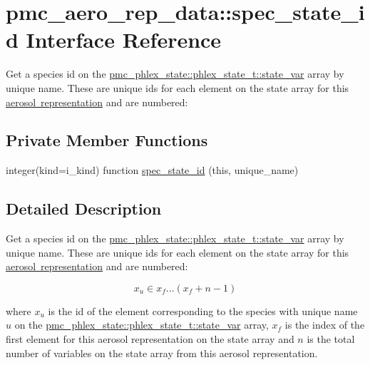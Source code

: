 \hypertarget{interfacepmc__aero__rep__data_1_1spec__state__id}{}\section{pmc\+\_\+aero\+\_\+rep\+\_\+data\+:\+:spec\+\_\+state\+\_\+id Interface Reference}
\label{interfacepmc__aero__rep__data_1_1spec__state__id}


Get a species id on the {\ttfamily \mbox{\hyperlink{structpmc__phlex__state_1_1phlex__state__t_a78835cb552d483ebbfc7a6bc6f756918}{pmc\+\_\+phlex\+\_\+state\+::phlex\+\_\+state\+\_\+t\+::state\+\_\+var}}} array by unique name. These are unique ids for each element on the state array for this \mbox{\hyperlink{phlex_aero_rep}{aerosol representation}} and are numbered\+:  


\subsection*{Private Member Functions}
\begin{DoxyCompactItemize}
\item 
integer(kind=i\+\_\+kind) function \mbox{\hyperlink{interfacepmc__aero__rep__data_1_1spec__state__id_a0ea7f29bcd2b13b0eed257e6f7fc99b3}{spec\+\_\+state\+\_\+id}} (this, unique\+\_\+name)
\end{DoxyCompactItemize}


\subsection{Detailed Description}
Get a species id on the {\ttfamily \mbox{\hyperlink{structpmc__phlex__state_1_1phlex__state__t_a78835cb552d483ebbfc7a6bc6f756918}{pmc\+\_\+phlex\+\_\+state\+::phlex\+\_\+state\+\_\+t\+::state\+\_\+var}}} array by unique name. These are unique ids for each element on the state array for this \mbox{\hyperlink{phlex_aero_rep}{aerosol representation}} and are numbered\+: 

\[x_u \in x_f ... (x_f+n-1)\]

where $x_u$ is the id of the element corresponding to the species with unique name $u$ on the {\ttfamily \mbox{\hyperlink{structpmc__phlex__state_1_1phlex__state__t_a78835cb552d483ebbfc7a6bc6f756918}{pmc\+\_\+phlex\+\_\+state\+::phlex\+\_\+state\+\_\+t\+::state\+\_\+var}}} array, $x_f$ is the index of the first element for this aerosol representation on the state array and $n$ is the total number of variables on the state array from this aerosol representation.

